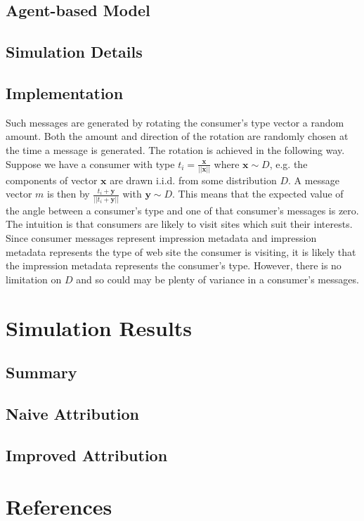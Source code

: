 \documentclass{article}
\begin{document}
\subsection{Agent-based Model}

\subsection{Simulation Details}

\subsection{Implementation}

Such messages are generated by rotating the consumer's type vector a random amount. Both the amount and direction of the rotation are randomly chosen at the time a message is generated. The rotation is achieved in the following way. Suppose we have a consumer with type $t_i = \frac{\bm{x}}{||\bm{x}||}$ where $\bm{x} \sim D$, e.g. the components of vector $\bm{x}$ are drawn i.i.d. from some distribution $D$. A message vector $m$ is then by $\frac{t_i + \bm{y}}{||t_i + \bm{y}||}$ with $\bm{y} \sim D$. This means that the expected value of the angle between a consumer's type and one of that consumer's messages is zero. The intuition is that consumers are likely to visit sites which suit their interests. Since consumer messages represent impression metadata and impression metadata represents the type of web site the consumer is visiting, it is likely that the impression metadata represents the consumer's type. However, there is no limitation on $D$ and so could may be plenty of variance in a consumer's messages.

\newpage

\section{Simulation Results}

\subsection{Summary}

\subsection{Naive Attribution}

\subsection{Improved Attribution}

\section{References}



\end{document}
